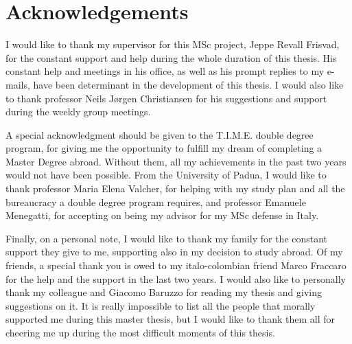 \chapter{Acknowledgements}
I would like to thank my supervisor for this MSc project, Jeppe Revall Frisvad, for the constant support and help during the whole duration of this thesis. His constant help and meetings in his office, as well as his prompt replies to my e-mails, have been determinant in the development of this thesis. I would also like to thank professor Neils J\o rgen Christiansen for his suggestions and support during the weekly group meetings.

A special acknowledgment should be given to the T.I.M.E. double degree program, for giving me the opportunity to fulfill my dream of completing a Master Degree abroad. Without them, all my achievements in the past two years would not have been possible. From the University of Padua, I would like to thank professor Maria Elena Valcher, for helping with my study plan and all the bureaucracy a double degree program requires, and professor Emanuele Menegatti, for accepting on being my advisor for my MSc defense in Italy.

Finally, on a personal note, I would like to thank my family for the constant support they give to me, supporting also in my decision to study abroad. Of my friends, a special thank you is owed to my italo-colombian friend Marco Fraccaro for the help and the support in the last two years. I would also like to personally thank my colleague and Giacomo Baruzzo for reading my thesis and giving suggestions on it. It is really impossible to list all the people that morally supported me during this master thesis, but I would like to thank them all for cheering me up during the most difficult moments of this thesis.    